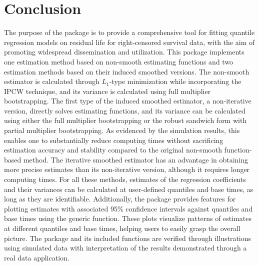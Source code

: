 \section{Conclusion} \label{sec:conclusion}

The purpose of the  package is to provide a comprehensive tool for fitting quantile regression models on residual life for right-censored survival data, with the aim of promoting widespread dissemination and utilization.
This package implements one estimation method based on non-smooth estimating functions and two estimation methods 
based on their induced smoothed versions.
The non-smooth estimator is calculated through $L_{1}$-type minimization while incorporating the IPCW technique, 
and its variance is calculated using full multiplier bootstrapping. 
The first type of the induced smoothed estimator, a non-iterative version, directly solves estimating functions, 
and its variance can be calculated using either the full multiplier bootstrapping or 
the robust sandwich form with partial multiplier bootstrapping.
As evidenced by the simulation results, this enables one to substantially reduce computing times without sacrificing 
estimation accuracy and stability compared to the original non-smooth function-based method. 
The iterative smoothed estimator has an advantage in obtaining more precise estimates than its non-iterative version, 
although it requires longer computing times. For all these methods, estimates of the regression coefficients and their
variances can be calculated at user-defined quantiles and base times, as long as they are identifiable. 
Additionally, the package provides features for plotting estimates with associated 95\% confidence intervals against 
quantiles and base times using the generic  function. 
These plots visualize patterns of estimates at different quantiles and base times, 
helping users to easily grasp the overall picture.
The package  and its included functions are verified through illustrations using simulated data 
with interpretation of the results demonstrated through a real data application.


